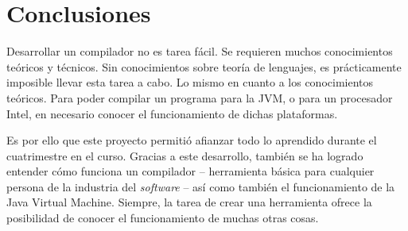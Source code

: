 \documentclass{article}
\begin{document}
    \clearpage

    \section{Conclusiones}
    \par Desarrollar un compilador no es tarea fácil. Se requieren muchos conocimientos teóricos y técnicos. Sin conocimientos sobre teoría de lenguajes, es prácticamente imposible llevar esta tarea a cabo. Lo mismo en cuanto a los conocimientos teóricos. Para poder compilar un programa para la JVM, o para un procesador Intel, en necesario conocer el funcionamiento de dichas plataformas.
    \par Es por ello que este proyecto permitió afianzar todo lo aprendido durante el cuatrimestre en el curso. Gracias a este desarrollo, también se ha logrado entender cómo funciona un compilador – herramienta básica para cualquier persona de la industria del \textit{software} – así como también el funcionamiento de la Java Virtual Machine. Siempre, la tarea de crear una herramienta ofrece la posibilidad de conocer el funcionamiento de muchas otras cosas.
    \\



    \clearpage
\end{document}
